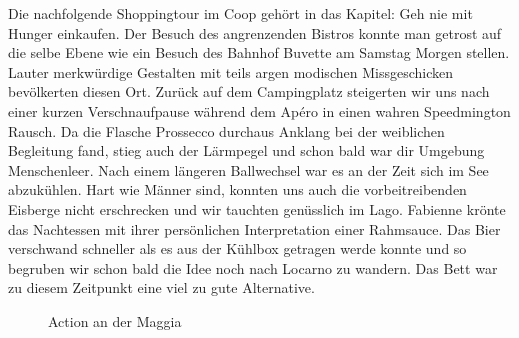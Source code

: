Die nachfolgende Shoppingtour im Coop gehört in das Kapitel: Geh nie mit Hunger einkaufen.
Der Besuch des angrenzenden Bistros konnte man getrost auf die selbe Ebene wie ein Besuch des Bahnhof Buvette am Samstag Morgen stellen.
Lauter merkwürdige Gestalten mit teils argen modischen Missgeschicken bevölkerten diesen Ort.
Zurück auf dem Campingplatz steigerten wir uns nach einer kurzen Verschnaufpause während dem Apéro in einen wahren Speedmington Rausch.
Da die Flasche Prossecco durchaus Anklang bei der weiblichen Begleitung fand, stieg auch der Lärmpegel und schon bald war dir Umgebung Menschenleer.
Nach einem längeren Ballwechsel war es an der Zeit sich im See abzukühlen.
Hart wie Männer sind, konnten uns auch die vorbeitreibenden Eisberge nicht erschrecken und wir tauchten genüsslich im Lago.
Fabienne krönte das Nachtessen mit ihrer persönlichen Interpretation einer Rahmsauce.
Das Bier verschwand schneller als es aus der Kühlbox getragen werde konnte und so begruben wir schon bald die Idee noch nach Locarno zu \glqq wandern\grqq{}.
Das Bett war zu diesem Zeitpunkt eine viel zu gute Alternative.

\begin{figure}[H]
   \centering
   \quad
   \quad
   \quad
   \caption[Action an der Maggia]{Action an der Maggia}
\end{figure}

